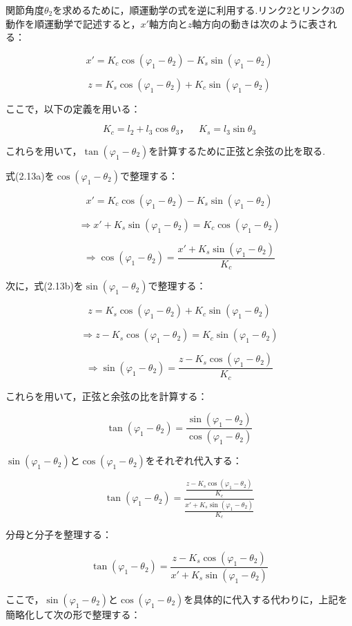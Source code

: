 関節角度$\theta_2$を求めるために，順運動学の式を逆に利用する.リンク2とリンク3の動作を順運動学で記述すると，$x'$軸方向と$z$軸方向の動きは次のように表される：

\[
  x' = K_c \cos(\varphi_1 - \theta_2) - K_s \sin(\varphi_1 - \theta_2) \tag{2.13a}
\]

\[
  z = K_s \cos(\varphi_1 - \theta_2) + K_c \sin(\varphi_1 - \theta_2) \tag{2.13b}
\]

ここで，以下の定義を用いる：

\[
  K_c = l_2 + l_3 \cos \theta_3， \quad K_s = l_3 \sin \theta_3
\]

これらを用いて，$\tan(\varphi_1 - \theta_2)$を計算するために正弦と余弦の比を取る.


式(2.13a)を$\cos(\varphi_1 - \theta_2)$で整理する：

\[
  x' = K_c \cos(\varphi_1 - \theta_2) - K_s \sin(\varphi_1 - \theta_2)
\]

\[
  \Rightarrow x' + K_s \sin(\varphi_1 - \theta_2) = K_c \cos(\varphi_1 - \theta_2)
\]

\[
  \Rightarrow \cos(\varphi_1 - \theta_2) = \frac{x' + K_s \sin(\varphi_1 - \theta_2)}{K_c}
\]

次に，式(2.13b)を$\sin(\varphi_1 - \theta_2)$で整理する：

\[
  z = K_s \cos(\varphi_1 - \theta_2) + K_c \sin(\varphi_1 - \theta_2)
\]

\[
  \Rightarrow z - K_s \cos(\varphi_1 - \theta_2) = K_c \sin(\varphi_1 - \theta_2)
\]

\[
  \Rightarrow \sin(\varphi_1 - \theta_2) = \frac{z - K_s \cos(\varphi_1 - \theta_2)}{K_c}
\]

これらを用いて，正弦と余弦の比を計算する：

\[
  \tan(\varphi_1 - \theta_2) = \frac{\sin(\varphi_1 - \theta_2)}{\cos(\varphi_1 - \theta_2)}
\]

$\sin(\varphi_1 - \theta_2)$と$\cos(\varphi_1 - \theta_2)$をそれぞれ代入する：

\[
  \tan(\varphi_1 - \theta_2) = \frac{\frac{z - K_s \cos(\varphi_1 - \theta_2)}{K_c}}{\frac{x' + K_s \sin(\varphi_1 - \theta_2)}{K_c}}
\]

分母と分子を整理する：

\[
  \tan(\varphi_1 - \theta_2) = \frac{z - K_s \cos(\varphi_1 - \theta_2)}{x' + K_s \sin(\varphi_1 - \theta_2)}
\]

ここで，$\sin(\varphi_1 - \theta_2)$と$\cos(\varphi_1 - \theta_2)$を具体的に代入する代わりに，上記を簡略化して次の形で整理する：

